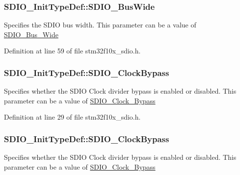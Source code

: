 \subsubsection[{\texorpdfstring{S\+D\+I\+O\+\_\+\+Bus\+Wide}{SDIO_BusWide}}]{ S\+D\+I\+O\+\_\+\+Init\+Type\+Def\+::\+S\+D\+I\+O\+\_\+\+Bus\+Wide}\hypertarget{struct_s_d_i_o___init_type_def_a0540529f615c2b29933b442bc326f0a7}{}\label{struct_s_d_i_o___init_type_def_a0540529f615c2b29933b442bc326f0a7}
Specifies the S\+D\+IO bus width. This parameter can be a value of \hyperlink{group___s_d_i_o___bus___wide}{S\+D\+I\+O\+\_\+\+Bus\+\_\+\+Wide} 

Definition at line 59 of file stm32f10x\+\_\+sdio.\+h.

\subsubsection[{\texorpdfstring{S\+D\+I\+O\+\_\+\+Clock\+Bypass}{SDIO_ClockBypass}}]{ S\+D\+I\+O\+\_\+\+Init\+Type\+Def\+::\+S\+D\+I\+O\+\_\+\+Clock\+Bypass}\hypertarget{struct_s_d_i_o___init_type_def_a7ac344acae747568176fba3d309d511f}{}\label{struct_s_d_i_o___init_type_def_a7ac344acae747568176fba3d309d511f}
Specifies whether the S\+D\+IO Clock divider bypass is enabled or disabled. This parameter can be a value of \hyperlink{group___s_d_i_o___clock___bypass}{S\+D\+I\+O\+\_\+\+Clock\+\_\+\+Bypass} 

Definition at line 29 of file stm32f10x\+\_\+sdio.\+h.

\subsubsection[{\texorpdfstring{S\+D\+I\+O\+\_\+\+Clock\+Bypass}{SDIO_ClockBypass}}]{ S\+D\+I\+O\+\_\+\+Init\+Type\+Def\+::\+S\+D\+I\+O\+\_\+\+Clock\+Bypass}\hypertarget{struct_s_d_i_o___init_type_def_a6a06a65a5630b21da261f46125cb20b1}{}\label{struct_s_d_i_o___init_type_def_a6a06a65a5630b21da261f46125cb20b1}
Specifies whether the S\+D\+IO Clock divider bypass is enabled or disabled. This parameter can be a value of \hyperlink{group___s_d_i_o___clock___bypass}{S\+D\+I\+O\+\_\+\+Clock\+\_\+\+Bypass} 

